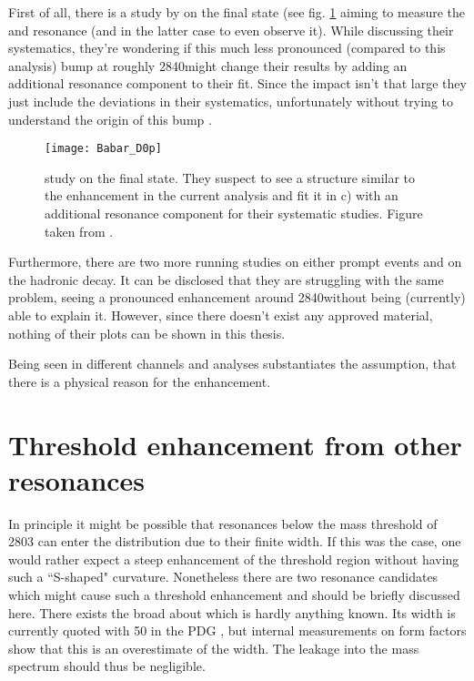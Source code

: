 First of all, there is a study by \babar on the \Dz\proton final state (see fig. \ref{fig:Babar_D0p} aiming to measure the \LcResI and \LcResII resonance (and in the latter case to even observe it).
While discussing their systematics, they're wondering if this much less pronounced (compared to this analysis) bump at roughly 2840\mev might change their results by adding an additional resonance component to their fit. 
Since the impact isn't that large they just include the deviations in their systematics, unfortunately without trying to understand the origin of this bump \cite{BaBar_D0p}.
\begin{figure}[hptb]
	\centering
	\texttt{[image: Babar\_D0p]}
	\caption{\babar study on the \Dz\proton final state. They suspect to see a structure similar to the enhancement in the current analysis and fit it in c) with an additional resonance component for their systematic studies. Figure taken from \cite{BaBar_D0p}.}
	\label{fig:Babar_D0p}
\end{figure}

Furthermore, there are two more running \lhcb studies on either prompt \Dz\proton events and on the hadronic \decay{\Lb}{\Dz\proton\pim} decay.
It can be disclosed that they are struggling with the same problem, seeing a pronounced enhancement around 2840\mev without being (currently) able to explain it.
However, since there doesn't exist any approved material, nothing of their plots can be shown in this thesis.

Being seen in different channels and analyses substantiates the assumption, that there is a physical reason for the enhancement.

\section{Threshold enhancement from other resonances}
In principle it might be possible that resonances below the \Dz\proton mass threshold of 2803 \mev can enter the distribution due to their finite width.
If this was the case, one would rather expect a steep enhancement of the threshold region without having such a ``S-shaped" curvature.
Nonetheless there are two resonance candidates which might cause such a threshold enhancement and should be briefly discussed here.
There exists the broad  about which is hardly anything known.
Its width is currently quoted with 50 \mev in the PDG \cite{PDG}, but internal \lhcb measurements on \Lb form factors show that this is an overestimate of the  width.
The leakage into the \Dz\proton mass spectrum should thus be negligible.

